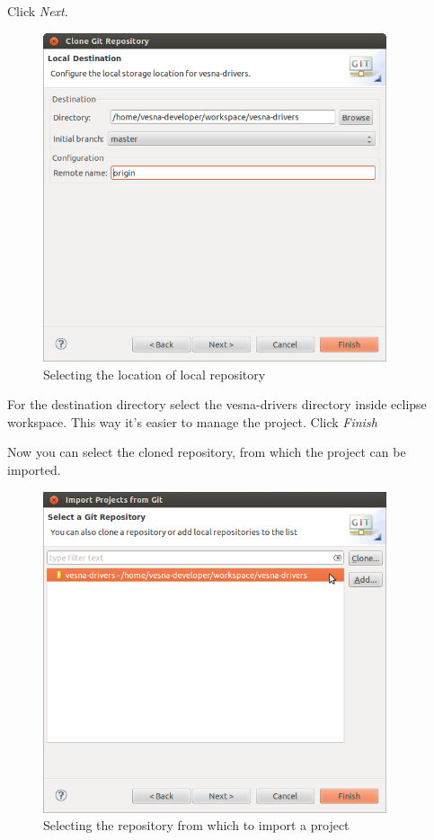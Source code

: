 \documentclass[a4paper, 10pt]{article}
\begin{document}
Click \emph{Next}.

    \begin{figure}[H]
    \centering
        \includegraphics[width=0.9\textwidth]{./install-guide-linux-images/test-clone-location.png}
        \caption{Selecting the location of local repository}
        \label{fig:test-clone-location}
    \end{figure}

For the destination directory select the
vesna-drivers directory inside eclipse workspace.
This way it's easier to manage the project.
Click \emph{Finish}

Now you can select the cloned repository, from which the project
can be imported.

    \begin{figure}[H]
    \centering
        \includegraphics[width=0.9\textwidth]{./install-guide-linux-images/test-select-repo.png}
        \caption{Selecting the repository from which to import a project}
        \label{fig:test-select-repo}
    \end{figure}
\end{document}
